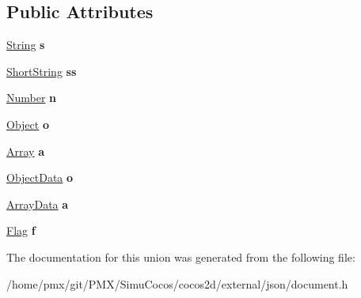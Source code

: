 \subsection*{Public Attributes}
\begin{DoxyCompactItemize}
\item 
\mbox{\label{unionGenericValue_1_1Data_a6872a4b93763944063b425e6c001ed2b}} 
\hyperlink{structGenericValue_1_1String}{String} {\bfseries s}
\item 
\mbox{\label{unionGenericValue_1_1Data_a410e39a5dc296eb3b152b54193740e4c}} 
\hyperlink{structGenericValue_1_1ShortString}{Short\+String} {\bfseries ss}
\item 
\mbox{\label{unionGenericValue_1_1Data_a243007cce2f4b75bea3e3c1ee4c3c239}} 
\hyperlink{unionGenericValue_1_1Number}{Number} {\bfseries n}
\item 
\mbox{\label{unionGenericValue_1_1Data_a15c6847aa3272560aaff5e7ed4320a7f}} 
\hyperlink{structGenericValue_1_1Object}{Object} {\bfseries o}
\item 
\mbox{\label{unionGenericValue_1_1Data_a1935b99b33ec9deff9f6360f8fa7b812}} 
\hyperlink{structGenericValue_1_1Array}{Array} {\bfseries a}
\item 
\mbox{\label{unionGenericValue_1_1Data_af6417eca530fba0d8bd65d309628eb11}} 
\hyperlink{structGenericValue_1_1ObjectData}{Object\+Data} {\bfseries o}
\item 
\mbox{\label{unionGenericValue_1_1Data_aeac31cf55bf5a024cead5ecb63e4fd48}} 
\hyperlink{structGenericValue_1_1ArrayData}{Array\+Data} {\bfseries a}
\item 
\mbox{\label{unionGenericValue_1_1Data_ad8572112da083c775ce21bcbca96b2ab}} 
\hyperlink{structGenericValue_1_1Flag}{Flag} {\bfseries f}
\end{DoxyCompactItemize}


The documentation for this union was generated from the following file\+:\begin{DoxyCompactItemize}
\item 
/home/pmx/git/\+P\+M\+X/\+Simu\+Cocos/cocos2d/external/json/document.\+h\end{DoxyCompactItemize}
